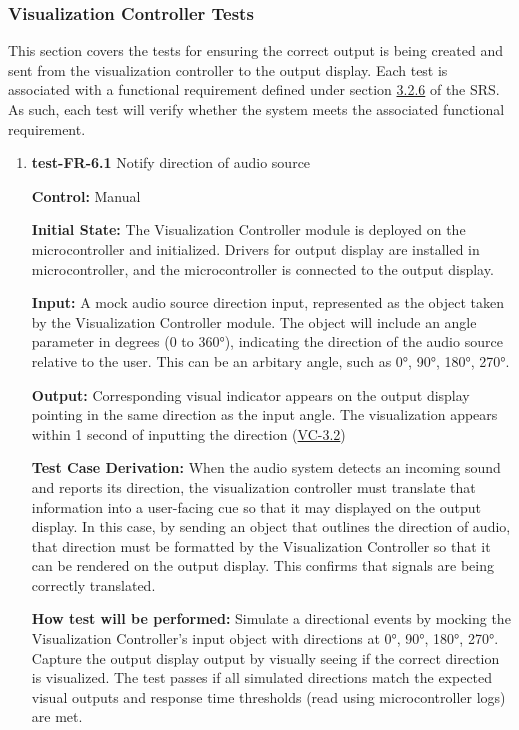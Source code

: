 \documentclass[12pt, titlepage]{article}
\begin{document}
\subsubsection{Visualization Controller Tests}

This section covers the tests for ensuring the correct output is being created 
and sent from the visualization controller to the output display. Each test is 
associated with a functional requirement defined under section 
\hyperref[SRS-sec:FR6]{3.2.6} of the SRS. As such, each test will verify whether
 the system meets the associated functional requirement. 

\begin{enumerate}

\item{\textbf{test-FR-6.1} Notify direction of audio source \\}

\textbf{Control:} Manual
					
\textbf{Initial State:} 
The Visualization Controller module is deployed on the microcontroller and 
initialized. Drivers for output display are installed in microcontroller, 
and the microcontroller is connected to the output display. 
					
\textbf{Input:}
A mock audio source direction input, represented as the object taken by the 
Visualization Controller module. The object will include an angle parameter in 
degrees (0 to 360°), indicating the direction of the audio source relative to 
the user. This can be an arbitary angle, such as 0°, 90°, 180°, 270°. 
					
\textbf{Output:}
Corresponding visual indicator appears on the output display pointing in 
the same direction as the input angle. The visualization 
appears within 1 second of inputting the direction 
(\hyperref[SRS-sec:VC-3.2]{VC-3.2}) 

\textbf{Test Case Derivation:} 
When the audio system detects an incoming sound and reports its direction, 
the visualization controller must translate that information into a user-facing 
cue so that it may displayed on the output display. In this case, by sending an 
object that outlines the direction of audio, that direction must be formatted 
by the Visualization Controller so that it can be rendered on the output display.
 This confirms that signals are being correctly translated.
					
\textbf{How test will be performed:}
Simulate a directional events by mocking the Visualization Controller's input 
object with directions at 0°, 90°, 180°, 270°. Capture the output display 
output by visually seeing if the correct direction is visualized. The test 
passes if all simulated directions match the expected visual outputs and 
response time thresholds (read using microcontroller logs) are met. 
					

\end{enumerate}
\end{document}
